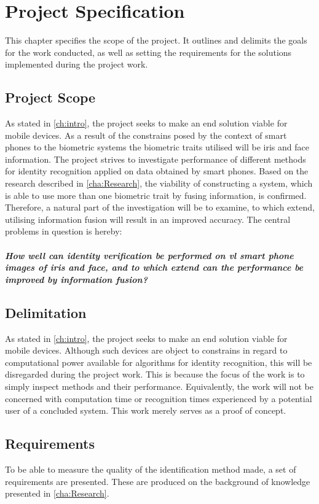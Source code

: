\chapter{Project Specification}\label{ch:projecspec}\glsresetall
This chapter specifies the scope of the project. It outlines and delimits the goals for the work conducted, as well as setting the requirements for the solutions implemented during the project work. 

\section{Project Scope}
As stated in \autoref{ch:intro}, the project seeks to make an end solution viable for mobile devices. As a result of the constrains posed by the context of smart phones to the biometric systems the biometric traits utilised will be iris and face information. The project strives to investigate performance of different methods for identity recognition applied on data obtained by smart phones. Based on the research described in \autoref{cha:Research}, the viability of constructing a system, which is able to use more than one biometric trait by fusing information, is confirmed. Therefore, a natural part of the investigation will be to examine, to which extend, utilising information fusion will result in an improved accuracy. The central problems in question is hereby:\\\\
\textit{\textbf{How well can identity verification be performed on \gls{vl} smart phone images of iris and face, and to which extend can the performance be improved by information fusion?}}

\section{Delimitation}\label{sec:deliproject}
As stated in \autoref{ch:intro}, the project seeks to make an end solution viable for mobile devices. Although such devices are object to constrains in regard to computational power available for algorithms for identity recognition, this will be disregarded during the project work. This is because the focus of the work is to simply inspect methods and their performance. Equivalently, the work will not be concerned with computation time or recognition times experienced by a potential user of a concluded system. This work merely serves as a proof of concept.

\section{Requirements}\label{ch:req}
To be able to measure the quality of the identification method made, a set of requirements are presented. These are produced on the background of knowledge presented in \autoref{cha:Research}.

